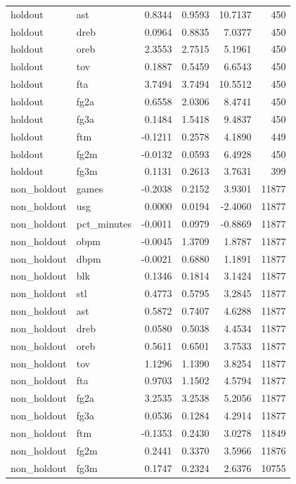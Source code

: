 \begin{table}
\begin{tabular}{llrrrr}
holdout & ast & 0.8344 & 0.9593 & 10.7137 & 450 \\
holdout & dreb & 0.0964 & 0.8835 & 7.0377 & 450 \\
holdout & oreb & 2.3553 & 2.7515 & 5.1961 & 450 \\
holdout & tov & 0.1887 & 0.5459 & 6.6543 & 450 \\
holdout & fta & 3.7494 & 3.7494 & 10.5512 & 450 \\
holdout & fg2a & 0.6558 & 2.0306 & 8.4741 & 450 \\
holdout & fg3a & 0.1484 & 1.5418 & 9.4837 & 450 \\
holdout & ftm & -0.1211 & 0.2578 & 4.1890 & 449 \\
holdout & fg2m & -0.0132 & 0.0593 & 6.4928 & 450 \\
holdout & fg3m & 0.1131 & 0.2613 & 3.7631 & 399 \\
non\_holdout & games & -0.2038 & 0.2152 & 3.9301 & 11877 \\
non\_holdout & usg & 0.0000 & 0.0194 & -2.4060 & 11877 \\
non\_holdout & pct\_minutes & -0.0011 & 0.0979 & -0.8869 & 11877 \\
non\_holdout & obpm & -0.0045 & 1.3709 & 1.8787 & 11877 \\
non\_holdout & dbpm & -0.0021 & 0.6880 & 1.1891 & 11877 \\
non\_holdout & blk & 0.1346 & 0.1814 & 3.1424 & 11877 \\
non\_holdout & stl & 0.4773 & 0.5795 & 3.2845 & 11877 \\
non\_holdout & ast & 0.5872 & 0.7407 & 4.6288 & 11877 \\
non\_holdout & dreb & 0.0580 & 0.5038 & 4.4534 & 11877 \\
non\_holdout & oreb & 0.5611 & 0.6501 & 3.7533 & 11877 \\
non\_holdout & tov & 1.1296 & 1.1390 & 3.8254 & 11877 \\
non\_holdout & fta & 0.9703 & 1.1502 & 4.5794 & 11877 \\
non\_holdout & fg2a & 3.2535 & 3.2538 & 5.2056 & 11877 \\
non\_holdout & fg3a & 0.0536 & 0.1284 & 4.2914 & 11877 \\
non\_holdout & ftm & -0.1353 & 0.2430 & 3.0278 & 11849 \\
non\_holdout & fg2m & 0.2441 & 0.3370 & 3.5966 & 11876 \\
non\_holdout & fg3m & 0.1747 & 0.2324 & 2.6376 & 10755 \\
\bottomrule
\end{tabular}
\end{table}
